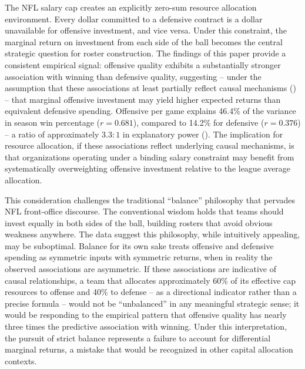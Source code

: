 The NFL salary cap creates an explicitly zero-sum resource allocation
environment. Every dollar committed to a defensive contract is a dollar
unavailable for offensive investment, and vice versa. Under this constraint,
the marginal return on investment from each side of the ball becomes the
central strategic question for roster construction. The findings of this paper
provide a consistent empirical signal: offensive quality exhibits a substantially
stronger association with winning than defensive quality, suggesting -- under
the assumption that these associations at least partially reflect causal
mechanisms () -- that marginal offensive investment
may yield higher expected returns than equivalent defensive spending. Offensive \xvoa{} per game explains 46.4\% of
the variance in season win percentage ($r = 0.681$), compared to 14.2\% for
defensive \xvoa{} ($r = 0.376$) -- a ratio of approximately $3.3 : 1$ in explanatory
power (). The implication for resource allocation,
if these associations reflect underlying causal mechanisms, is that
organizations operating under a binding salary constraint may benefit from
systematically overweighting offensive investment relative to the league
average allocation.

This consideration challenges the traditional ``balance'' philosophy that
pervades NFL front-office discourse. The conventional wisdom holds that teams
should invest equally in both sides of the ball, building rosters that avoid
obvious weakness anywhere. The data suggest this philosophy, while intuitively
appealing, may be suboptimal. Balance for its own sake treats offensive and
defensive spending as symmetric inputs with symmetric returns, when in reality
the observed associations are asymmetric. If these associations are indicative
of causal relationships, a team that allocates approximately 60\% of its
effective cap resources to offense and 40\% to defense -- as a directional
indicator rather than a precise formula -- would not be ``unbalanced'' in any
meaningful strategic sense; it would be responding to the empirical pattern that
offensive quality has nearly three times the predictive association with
winning. Under this interpretation, the pursuit of strict balance represents a
failure to account for differential marginal returns, a mistake that would be
recognized in other capital allocation contexts.

